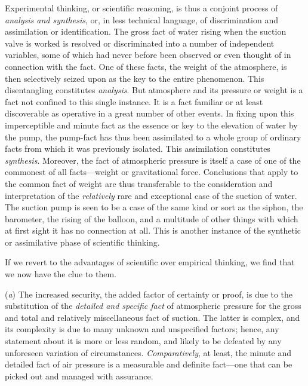 \documentclass[letterpaper]{book}
\begin{document}
Experimental thinking, or scientific reasoning, is thus a conjoint
process of \emph{analysis and synthesis}, or, in less technical
language, of discrimination and assimilation or identification. The
gross fact of water rising when the suction valve is worked is resolved
or discriminated into a number of independent variables, some of which
had never before been observed or even thought of in connection with the
fact. One of these facts, the weight of the atmosphere, is then
selectively seized upon as the key to the entire phenomenon. This
disentangling constitutes \emph{analysis}. But atmosphere and its
pressure or weight is a fact not confined to this single instance. It is
a fact familiar or at least discoverable as operative in a great number
of other events. In fixing upon this imperceptible and minute fact as
the essence or key to the elevation of water by the pump, the pump-fact
has thus been assimilated to a whole group of ordinary facts from which
it was previously isolated. This assimilation constitutes
\emph{synthesis}. Moreover, the fact of atmospheric pressure is itself a
case of one of the commonest of all facts---weight or gravitational
force. Conclusions that apply to the common fact of weight are thus
transferable to the consideration and interpretation of the
\emph{relatively} rare and exceptional case of the suction of water. The
suction pump is seen to be a case of the same kind or sort as the
siphon,
the
barometer, the rising of the balloon, and a multitude of other things
with which at first sight it has no connection at all. This is another
instance of the synthetic or assimilative phase of scientific thinking.

If we revert to the advantages of scientific over empirical thinking, we
find that we now have the clue to them.


(\emph{a}) The increased security, the added factor of certainty or
proof, is due to the substitution of the \emph{detailed and specific
fact} of atmospheric pressure for the gross and total and relatively
miscellaneous fact of suction. The latter is complex, and its complexity
is due to many unknown and unspecified factors; hence, any statement
about it is more or less random, and likely to be defeated by any
unforeseen variation of circumstances. \emph{Comparatively}, at least,
the minute and detailed fact of air pressure is a measurable and
definite fact---one that can be picked out and managed with assurance.

\end{document}
